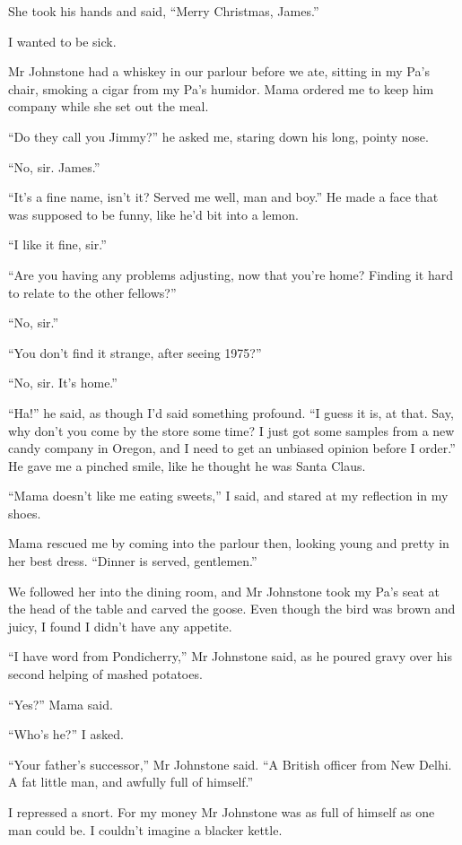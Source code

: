 She took his hands and said, ``Merry Christmas, James.''

I wanted to be sick.

\tb

Mr Johnstone had a whiskey in our parlour before we ate, sitting in
my Pa's chair, smoking a cigar from my Pa's humidor. Mama ordered
me to keep him company while she set out the meal.

``Do they call you Jimmy?'' he asked me, staring down his long,
pointy nose.

``No, sir. James.''

``It's a fine name, isn't it? Served me well, man and boy.'' He
made a face that was supposed to be funny, like he'd bit into a
lemon.

``I like it fine, sir.''

``Are you having any problems adjusting, now that you're home? Finding it hard 
to relate to the other fellows?''

``No, sir.''

``You don't find it strange, after seeing 1975?''

``No, sir. It's home.''

``Ha!'' he said, as though I'd said something profound.
``I guess it is, at that. Say, why don't you come by the store some time? I 
just got some samples from a new candy company in Oregon, and I need to get an 
unbiased opinion before I order.''
He gave me a pinched smile, like he thought he was Santa Claus.

``Mama doesn't like me eating sweets,'' I said, and stared at my
reflection in my shoes.

Mama rescued me by coming into the parlour then, looking young and
pretty in her best dress. ``Dinner is served, gentlemen.''

We followed her into the dining room, and Mr Johnstone took my Pa's
seat at the head of the table and carved the goose. Even though the
bird was brown and juicy, I found I didn't have any appetite.

``I have word from Pondicherry,'' Mr Johnstone said, as he poured
gravy over his second helping of mashed potatoes.

``Yes?'' Mama said.

``Who's he?'' I asked.

``Your father's successor,'' Mr Johnstone said.
``A British officer from New Delhi. A fat little man, and awfully full of 
himself.''

I repressed a snort. For my money Mr Johnstone was as full of
himself as one man could be. I couldn't imagine a blacker kettle.

